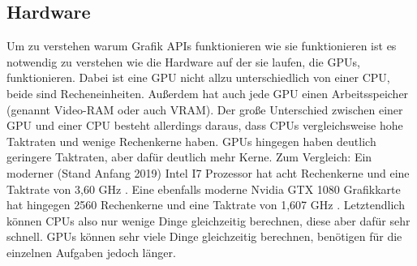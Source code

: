 \subsection{Hardware}
Um zu verstehen warum Grafik APIs funktionieren wie sie funktionieren ist es notwendig zu verstehen wie die Hardware auf der sie laufen, die GPUs, funktionieren. Dabei ist eine GPU nicht allzu unterschiedlich von einer CPU, beide sind Recheneinheiten. Außerdem hat auch jede GPU einen Arbeitsspeicher (genannt Video-RAM oder auch VRAM). Der große Unterschied zwischen einer GPU und einer CPU besteht allerdings daraus, dass CPUs vergleichsweise hohe Taktraten und wenige Rechenkerne haben. GPUs hingegen haben deutlich geringere Taktraten, aber dafür deutlich mehr Kerne. Zum Vergleich: Ein moderner (Stand Anfang 2019) Intel I7 Prozessor hat acht Rechenkerne und eine Taktrate von 3,60 GHz \cite{intel_i7_9700k_processor}. Eine ebenfalls moderne Nvidia GTX 1080 Grafikkarte hat hingegen 2560 Rechenkerne und eine Taktrate von 1,607 GHz \cite{nvidia_gtx_1080_gpu}. Letztendlich können CPUs also nur wenige Dinge gleichzeitig berechnen, diese aber dafür sehr schnell. GPUs können sehr viele Dinge gleichzeitig berechnen, benötigen für die einzelnen Aufgaben jedoch länger.